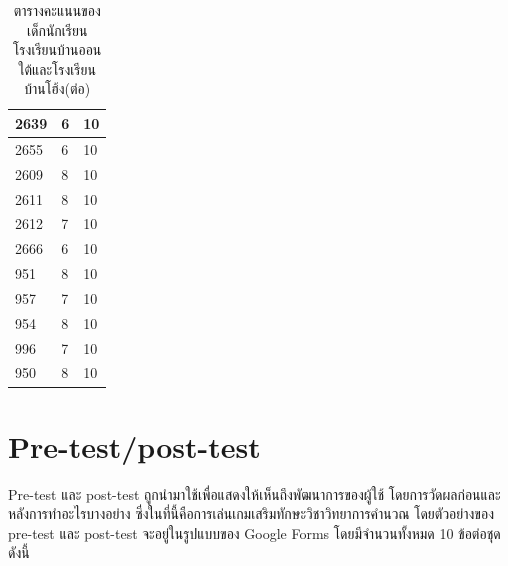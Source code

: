 \begin{table}[h]
\begin{center}
\begin{tabular}{ |p{3cm}|p{2cm}|p{2cm}| }
            \hline
            2639 & 6 & 10\\
            \hline
            2655 & 6 & 10\\
            \hline
            2609 & 8 & 10\\
            \hline
            2611 & 8 & 10\\
            \hline
            2612 & 7 & 10\\
            \hline
            2666 & 6 & 10\\
            \hline
            951 & 8 & 10\\
            \hline
            957 & 7 & 10\\
            \hline
            954 & 8 & 10\\
            \hline
            996 & 7 & 10\\
            \hline
            950 & 8 & 10\\
            \hline
        \end{tabular}
    \end{center}
    \caption[ตารางคะแนนรายของเด็กนักเรียนโรงเรียนบ้านออนใต้และโรงเรียนบ้านโฮ้ง(ต่อ)]{ตารางคะแนนของเด็กนักเรียนโรงเรียนบ้านออนใต้และโรงเรียนบ้านโฮ้ง(ต่อ)}
    \label{studentsscoretablecontinue}
\end{table}

\chapter{Pre-test/post-test}
Pre-test และ post-test ถูกนำมาใช้เพื่อแสดงให้เห็นถึงพัฒนาการของผู้ใช้ โดยการวัดผลก่อนและหลังการทำอะไรบางอย่าง ซึ่งในที่นี้คือการเล่นเกมเสริมทักษะวิชาวิทยาการคำนวณ
โดยตัวอย่างของ pre-test และ post-test จะอยู่ในรูปแบบของ Google Forms โดยมีจำนวนทั้งหมด 10 ข้อต่อชุด ดังนี้
